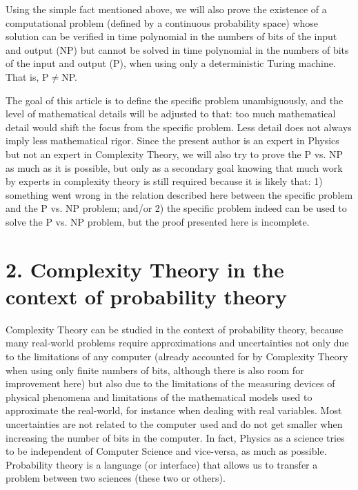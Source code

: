 \documentclass[11pt]{book}
\begin{document}
Using the simple fact mentioned above, we will also prove the existence
of a computational problem (defined by a continuous probability space)
whose solution can be verified in time polynomial in the numbers of bits
of the input and output (NP) but cannot be solved in time polynomial in
the numbers of bits of the input and output (P), when using only a
deterministic Turing machine\cite{pvsnp}\cite{10.1145ux2f800152.804913}. That is, P\(\neq\)NP.

The goal of this article is to define the specific problem
unambiguously, and the level of mathematical details will be adjusted to
that: too much mathematical detail would shift the focus from the
specific problem. Less detail does not always imply less mathematical
rigor. Since the present author is an expert in Physics but not an
expert in Complexity Theory, we will also try to prove the P vs. NP as
much as it is possible, but only as a secondary goal knowing that much
work by experts in complexity theory is still required because it is
likely that: 1) something went wrong in the relation described here
between the specific problem and the P vs. NP problem; and/or 2) the
specific problem indeed can be used to solve the P vs. NP problem, but
the proof presented here is incomplete.

\hypertarget{complexity-theory-in-the-context-of-probability-theory}{%
\section{2. Complexity Theory in the context of probability
theory}\label{complexity-theory-in-the-context-of-probability-theory}}

Complexity Theory can be studied in the context of probability
theory\cite{novak2008tractability}\cite{hennig2022probabilistic}\cite{ritter2000average}\cite{bna}, because many
real-world problems require approximations and uncertainties not only
due to the limitations of any computer (already accounted for by
Complexity Theory when using only finite numbers of bits, although there
is also room for improvement here) but also due to the limitations of
the measuring devices of physical phenomena and limitations of the
mathematical models used to approximate the real-world, for instance
when dealing with real variables. Most uncertainties are not related to
the computer used and do not get smaller when increasing the number of
bits in the computer. In fact, Physics as a science tries to be
independent of Computer Science and vice-versa, as much as possible.
Probability theory is a language (or interface) that allows us to
transfer a problem between two sciences (these two or others).
\end{document}
